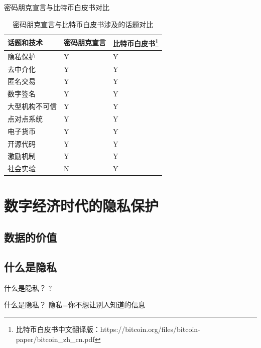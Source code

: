 \documentclass[11pt]{beamer}
\begin{document}
\begin{frame}{密码朋克宣言与比特币白皮书对比}
	\begin{table}[]
		\begin{tabular}{@{}lll@{}}
			\toprule
			话题和技术     & 密码朋克宣言 & 比特币白皮书\footnote{比特币白皮书中文翻译版：https://bitcoin.org/files/bitcoin-paper/bitcoin\_zh\_cn.pdf} \\ \midrule
			隐私保护       & Y      & Y      \\
			去中介化      & Y      & Y      \\
			匿名交易      & Y      & Y      \\
			数字签名      & Y      & Y      \\
			大型机构不可信 & Y   & Y \\
			点对点系统     & Y      & Y      \\
			电子货币      & Y      & Y      \\
			开源代码      & Y      & Y      \\
			激励机制      & Y      & Y      \\ 
			社会实验      & N      & Y      \\
			\bottomrule
		\end{tabular}
		\caption{密码朋克宣言与比特币白皮书涉及的话题对比}
		\label{tab:ccb}
	\end{table}
\end{frame}

\section{数字经济时代的隐私保护}

\subsection{数据的价值}

\subsection{什么是隐私}

\begin{frame}{什么是隐私？}
	\centering	
	{\huge ?}
\end{frame}

\begin{frame}{什么是隐私？}
	\centering
	{\large 隐私=你不想让别人知道的信息}
\end{frame}
\end{document}
